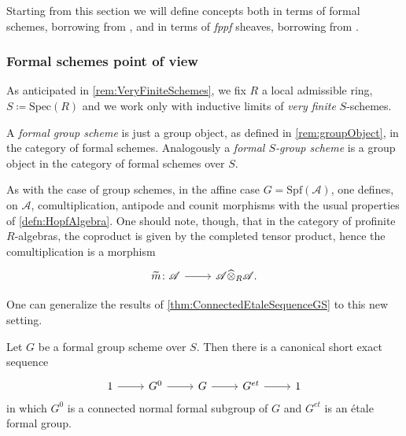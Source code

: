 Starting from this section we will define
concepts both in terms of formal schemes, borrowing from \cite{Shatz},
and in terms of {\em fppf} sheaves, borrowing from \cite{Messing}.



\subsubsection{Formal schemes point of view}
As anticipated in \cref{rem:VeryFiniteSchemes},
we fix $R$ a local admissible ring, $S \coloneqq \mathrm{Spec}(R)$
and we work only with inductive limits of {\em very finite} $S$-schemes.


\begin{defn}
	A {\em formal group scheme}
	is just a group object,
	as defined in \cref{rem:groupObject},
	in the category of formal schemes.
	Analogously a {\em formal $S$-group scheme}
	is a group object in the category of formal schemes over $S$.
\end{defn}


\begin{rem}[]\label{FormalHopf}
	As with the case of group schemes, in the affine case
	$G = \mathrm{Spf}(\mathscr{A})$,
	one defines, on $\mathscr{A}$, comultiplication, antipode and counit morphisms
	with the usual properties of \cref{defn:HopfAlgebra}.
	One should note, though, that in the category of 
	profinite $R$-algebras, the coproduct is given by
	the completed tensor product, hence the comultiplication
	is a morphism
	\begin{equation*}
	\begin{tikzcd}[row sep = 0ex
		,/tikz/column 1/.append style={anchor=base east}
		,/tikz/column 2/.append style={anchor=base west}]
		\widetilde{m}\colon \mathscr{A} \arrow[r, "", rightarrow] &
		\mathscr{A} \widehat{\otimes}_R \mathscr{A}
	.\end{tikzcd}
	\end{equation*} 
\end{rem}


\noindent
One can generalize the results of \cref{thm:ConnectedEtaleSequenceGS} to this new setting.
\begin{thm}\label{thm:ConnectedEtaleSeqFormalGr}
	Let $G$ be a formal group scheme over $S$.
	Then there is a canonical short exact sequence
	\begin{equation*}
	\begin{tikzcd}
		1 \arrow[r, "", rightarrow] &
		G^0 \arrow[r, "", rightarrow] &
		G \arrow[r, "", rightarrow] &
		G^{et} \arrow[r, "", rightarrow] &
		1
	\end{tikzcd}
	\end{equation*}
	in which $G^0$ is a connected normal formal subgroup of $G$
	and $G^{et}$ is an étale formal group.
\end{thm}


